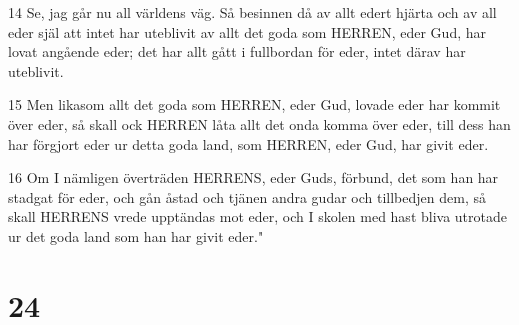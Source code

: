 \par 14 Se, jag går nu all världens väg. Så besinnen då av allt edert hjärta och av all eder själ att intet har uteblivit av allt det goda som HERREN, eder Gud, har lovat angående eder; det har allt gått i fullbordan för eder, intet därav har uteblivit.
\par 15 Men likasom allt det goda som HERREN, eder Gud, lovade eder har kommit över eder, så skall ock HERREN låta allt det onda komma över eder, till dess han har förgjort eder ur detta goda land, som HERREN, eder Gud, har givit eder.
\par 16 Om I nämligen överträden HERRENS, eder Guds, förbund, det som han har stadgat för eder, och gån åstad och tjänen andra gudar och tillbedjen dem, så skall HERRENS vrede upptändas mot eder, och I skolen med hast bliva utrotade ur det goda land som han har givit eder."

\chapter{24}

